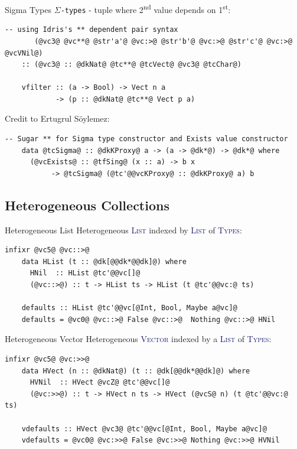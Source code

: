 \documentclass[xcolor={usenames,dvipsnames}]{beamer}
\newcommand{\htycon}[1]{\textcolor{MidnightBlue}{\textsc{#1}}}
\begin{document}
\begin{frame}[fragile]{Sigma Types}
  \texttt{$\Sigma$-types} - tuple where 2\textsuperscript{nd} value depends on 1\textsuperscript{st}:
  \begin{lstlisting}[style=hask]
    -- using Idris's ** dependent pair syntax
       (@vc3@ @vc**@ @str'a'@ @vc:>@ @str'b'@ @vc:>@ @str'c'@ @vc:>@ @vcVNil@)
    :: (@vc3@ :: @dkNat@ @tc**@ @tcVect@ @vc3@ @tcChar@)

    vfilter :: (a -> Bool) -> Vect n a
            -> (p :: @dkNat@ @tc**@ Vect p a)
  \end{lstlisting}

  \pause
  Credit to Ertugrul S\"oylemez: 
  \begin{lstlisting}[style=hask]
    -- Sugar ** for Sigma type constructor and Exists value constructor
    data @tcSigma@ :: @dkKProxy@ a -> (a -> @dk*@) -> @dk*@ where
      (@vcExists@ :: @tfSing@ (x :: a) -> b x
           -> @tcSigma@ (@tc'@@vcKProxy@ :: @dkKProxy@ a) b
  \end{lstlisting}
\end{frame}


\subsection{Heterogeneous Collections}

\begin{frame}[fragile]{Heterogeneous List}
  Heterogeneous \htycon{List} indexed by \htycon{List} of \htycon{Types}:
  \begin{lstlisting}[style=hask]
    infixr @vc5@ @vc::>@
    data HList (t :: @dk[@@dk*@@dk]@) where
      HNil  :: HList @tc'@@vc[]@
      (@vc::>@) :: t -> HList ts -> HList (t @tc'@@vc:@ ts)

    defaults :: HList @tc'@@vc[@Int, Bool, Maybe a@vc]@
    defaults = @vc0@ @vc::>@ False @vc::>@  Nothing @vc::>@ HNil
  \end{lstlisting}
\end{frame}

\begin{frame}[fragile]{Heterogeneous Vector}
  Heterogeneous \htycon{Vector} indexed by a \htycon{List} of \htycon{Types}:
  \begin{lstlisting}[style=hask]
    infixr @vc5@ @vc:>>@
    data HVect (n :: @dkNat@) (t :: @dk[@@dk*@@dk]@) where
      HVNil  :: HVect @vcZ@ @tc'@@vc[]@
      (@vc:>>@) :: t -> HVect n ts -> HVect (@vcS@ n) (t @tc'@@vc:@ ts)

    vdefaults :: HVect @vc3@ @tc'@@vc[@Int, Bool, Maybe a@vc]@
    vdefaults = @vc0@ @vc:>>@ False @vc:>>@ Nothing @vc:>>@ HVNil
  \end{lstlisting}
\end{frame}
\end{document}
